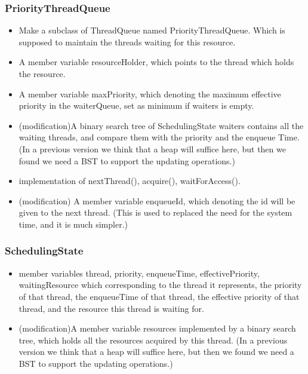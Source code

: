 \documentclass{article}
\begin{document}
	\subsubsection{PriorityThreadQueue}
	
	\begin{itemize}
		\item Make a subclass of ThreadQueue named PriorityThreadQueue. Which is supposed to maintain the threads waiting for this resource.
		
		\item A member variable resourceHolder, which points to the thread which holds the resource.
		
		\item A member variable maxPriority, which denoting the maximum effective priority in the waiterQueue, set as minimum if waiters is empty.
		
		\item (modification)A binary search tree of SchedulingState waiters contains all the waiting threads, and compare them with the priority and the enqueue Time. (In a previous version we think that a heap will suffice here, but then we found we need a BST to support the updating operations.)
		
		\item implementation of nextThread(), acquire(), waitForAccess().
		
		\item (modification) A member variable enqueueId, which denoting the id will be given to the next thread. (This is used to replaced the need for the system time, and it is much simpler.)
	\end{itemize}
	
	\subsubsection{SchedulingState}
	
		\begin{itemize}
			
			\item member variables thread, priority, enqueueTime, effectivePriority, waitingResource which corresponding to the thread it represents, the priority of that thread, the enqueueTime of that thread, the effective priority of that thread, and the resource this thread is waiting for.
			
			\item (modification)A member variable resources implemented by a binary search tree, which holds all the resources acquired by this thread. (In a previous version we think that a heap will suffice here, but then we found we need a BST to support the updating operations.)
		\end{itemize}
	
\end{document}
